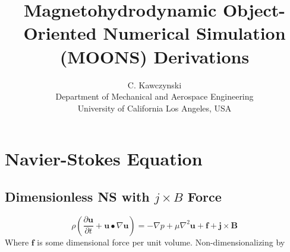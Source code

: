 \newcommand{\bibDir}{../../../LATEX/} %

\usepackage{dirtree}
\usepackage{lmodern}
\usepackage{listings}
\usepackage{color}

\newcommand{\eqtab}{\;\;\;\;\;\;\;\;\;\;\;\;\;\;\;\;}
\newcommand{\divBz}{$\nabla \bullet B = 0$}
\newcommand{\divB}{$\nabla \bullet B$}
\newcommand{\Rem}{$Re_m$}
\newcommand{\jcrossB}{$j \times B$}

\newcommand{\figW}{5.in}
\newcommand{\figH}{4.in}

\newcommand{\ffigW}{3.1in}
\newcommand{\ffigH}{3.1in}




\doublespacing
\title{Magnetohydrodynamic Object-Oriented Numerical Simulation (MOONS) Derivations}
\author{C. Kawczynski \\
Department of Mechanical and Aerospace Engineering \\
University of California Los Angeles, USA\\
}
\maketitle

\section{Navier-Stokes Equation}
\subsection{Dimensionless NS with $j \times B$ Force}
\begin{equation}
\rho \left( \frac{\partial \pmb{u}}{\partial t} + \pmb{u} \bullet \nabla \pmb{u} \right) = 
-\nabla p + \mu \nabla^2 \pmb{u} + \pmb{f} + \pmb{j} \times \pmb{B}
\end{equation}
Where $\pmb{f}$ is some dimensional force per unit volume. Non-dimensionalizing by

